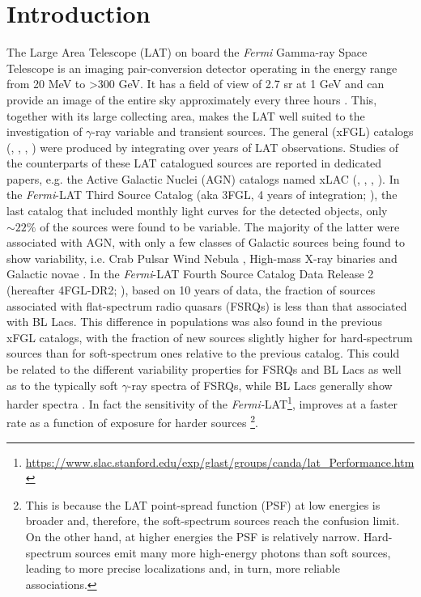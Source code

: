 \documentclass{aastex62}
\newcommand\fermilat{{\it Fermi}-LAT }
\begin{document}


\section{Introduction}\label{sec:intro}
The Large Area Telescope (LAT) on board the {\it Fermi} Gamma-ray Space Telescope is an imaging pair-conversion detector operating in the energy range from 20 MeV to >300 GeV. It has a field of view of 2.7 sr at 1 GeV and can provide an image of the entire sky approximately every three hours \citep{atwood2009large}. This, together with its large collecting area, makes the LAT well suited to the investigation of $\gamma$-ray variable and transient sources. 
The general (xFGL) catalogs (\citealt{abdo2010fermi1FGL}, \citealt{nolan2012fermi2FGL}, \citealt{acero2015fermi3FGL}, \citealt{20204FGL}) were produced by integrating over years of LAT observations. Studies of the counterparts of these LAT catalogued sources are reported in dedicated papers, e.g. the Active Galactic Nuclei (AGN) catalogs named xLAC (\citealt{abdo2010firstLAC}, \citealt{ackermann2011secondLAC}, \citealt{ackermann20153LAC}, \citealt{20204LAC}). In the \fermilat Third Source Catalog (aka 3FGL, 4 years of integration;  \citealt{acero2015fermi3FGL}), the last catalog that included monthly light curves for the detected objects, only $\sim 22\%$ of the sources were found to be variable. The majority of the latter were associated with AGN, with only a few classes of Galactic sources being found to show variability, i.e. Crab Pulsar Wind Nebula \citep{2011Sci...331..736T}, High-mass X-ray binaries \citep{fermi2009modulated} and Galactic novae \citep{2014Sci...345..554A}.
In the \fermilat Fourth Source Catalog Data Release 2 (hereafter 4FGL-DR2; \citealt{ballet2020fermi}), based on 10 years of data, the fraction of sources associated with flat-spectrum radio quasars (FSRQs) is less than that associated with BL Lacs. This difference in populations was also found in the previous xFGL catalogs, with the fraction of new sources slightly higher for hard-spectrum sources than for soft-spectrum ones relative to the previous catalog.
This could be related to the different variability properties for FSRQs and BL Lacs  as well as to the typically soft $\gamma$-ray spectra of FSRQs, while BL Lacs generally show harder spectra \citep{abdo2010gamma}.
In fact the sensitivity of the  \textit{Fermi-}LAT\footnote{\label{fn:slac}\url{https://www.slac.stanford.edu/exp/glast/groups/canda/lat_Performance.htm}}, improves at a faster rate as a function of exposure for harder sources
\footnote{This is because the LAT point-spread function (PSF) at low energies is broader and, therefore, the soft-spectrum sources reach the confusion limit. On the other hand, at higher energies the PSF is relatively narrow. Hard-spectrum sources emit many more high-energy photons than soft sources, leading to more precise localizations and, in turn, more reliable associations.}.
\end{document}
